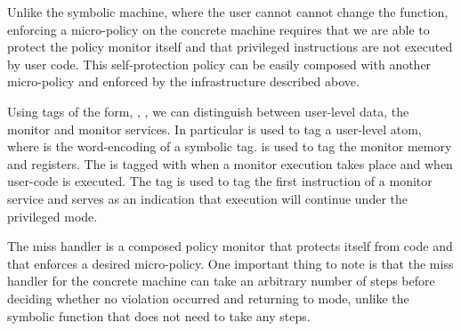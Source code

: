 Unlike the symbolic machine, where the user cannot cannot change the
\TRANSFER function, enforcing a micro-policy on the concrete machine requires
that we are able to protect the policy monitor itself and that privileged
instructions are not executed by user code. This self-protection policy can be
easily composed with another micro-policy and enforced by the infrastructure
described above.

Using tags of the form, , , \MONITOR we can
distinguish between user-level data, the monitor and monitor services.
In particular  is used to tag a user-level atom, where  is
the word-encoding of a symbolic tag. \MONITOR is used to tag the monitor memory
and registers. The \pc is tagged with \MONITOR when a monitor
execution takes place and  when user-code is executed. The tag
 is used to tag the first instruction of a monitor service and
serves as an indication that execution will continue under the privileged
\MONITOR mode. 

The miss handler is a composed policy monitor that protects itself
from \USERname code and that enforces a desired micro-policy.  One
important thing to note is that the miss handler for the concrete
machine can take an arbitrary number of steps before deciding whether
no violation occurred and returning to \USERname mode, unlike the
symbolic \TRANSFER function that does not need to take any steps.
